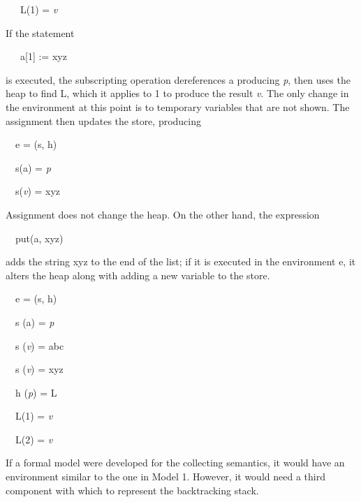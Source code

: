 {\ttfamily\mdseries
\ \ \ L(1) = \textit{v}\textit{}}


If the statement 

{\ttfamily\mdseries
\ \ \ a[1] := {\textquotedbl}xyz{\textquotedbl}}

\noindent is executed, the subscripting operation dereferences a
producing \textit{p}\textit{}, then uses the heap to
find L, which it applies to 1 to produce the result
\textit{v}\textit{}. The only change in the
environment at this point is to temporary variables that are not
shown. The assignment then updates the store, producing

{\ttfamily\mdseries
\ \ e = (s, h)}

{\ttfamily\mdseries
\ \ s(a) = \textit{p}\textit{}}

{\ttfamily\mdseries
\ \ s(\textit{v}\textit{}) = {\textquotedbl}xyz{\textquotedbl}}


Assignment does not change the heap. On the other hand, the expression 

{\ttfamily\mdseries
\ \ put(a, {\textquotedbl}xyz{\textquotedbl})}

\noindent adds the string xyz to the end of the list; if it is
executed in the environment e, it alters the heap along with adding a
new variable to the store.

{\ttfamily\mdseries
\ \ e = (s, h)}

{\ttfamily\mdseries
\ \ s (a) = \textit{p}\textit{}}

{\ttfamily\mdseries
\ \ s (\textit{v}\textit{}) = {\textquotedbl}abc{\textquotedbl}}

{\ttfamily\mdseries
\ \ s (\textit{v}\textit{}) = {\textquotedbl}xyz{\textquotedbl}}

{\ttfamily\mdseries
\ \ h (\textit{p}\textit{}) = L}

{\ttfamily\mdseries
\ \ L(1) = \textit{v}\textit{}}

{\ttfamily\mdseries
\ \ L(2) = \textit{v}\textit{}}


If a formal model were developed for the collecting semantics, it
would have an environment similar to the one in Model 1. However, it
would need a third component with which to represent the backtracking
stack.

